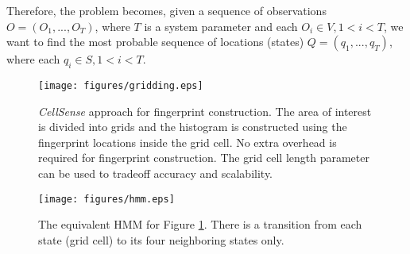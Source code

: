 \documentclass[conference]{IEEEtran}
\begin{document}
 Therefore, the problem becomes, given a sequence of observations $O = (O_1,...,O_T)$, where $T$ is a system parameter and each $O_i \in V, 1<i<T$, we want to
find the most probable sequence of locations (states) $Q
=(q_1,...,q_T)$, where each $q_i \in S, 1<i<T$.

\begin{figure}[!t]
\centering
      \texttt{[image: figures/gridding.eps]}
  \caption{\textit{CellSense} approach for fingerprint construction. The area of interest is divided into grids and the histogram is constructed using the
  fingerprint locations inside the grid cell. No extra overhead is required for fingerprint construction. The grid cell length parameter can be used to tradeoff
  accuracy and scalability.}
  \label{fig:grid}
\end{figure}

\begin{figure}[!t]
\centering
      \texttt{[image: figures/hmm.eps]}
  \caption{The equivalent HMM for Figure \ref{fig:grid}. There is a transition from each state (grid cell) to its four neighboring states only.}
  \label{fig:hmm}
\end{figure}
\end{document}
